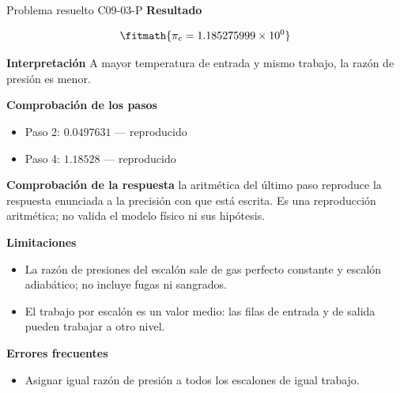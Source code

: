 \documentclass[10pt,openany]{book}
\begin{document}
\begin{studiumworked}{Problema resuelto C09-03-P}
\noindent\textbf{Resultado}

\[
\fitmath{\pi_c=1.185275999\times10^{0}}
\]

\noindent\textbf{Interpretación}
A mayor temperatura de entrada y mismo trabajo, la razón de presión es menor.

\noindent\textbf{Comprobación de los pasos}
\begin{itemize}
\item Paso 2: $0.0497631$ — reproducido
\item Paso 4: $1.18528$ — reproducido
\end{itemize}

\noindent\textbf{Comprobación de la respuesta} la aritmética del último paso reproduce la respuesta enunciada a la precisión con que está escrita. Es una reproducción aritmética; no valida el modelo físico ni sus hipótesis.

\noindent\textbf{Limitaciones}
\begin{itemize}
\item La razón de presiones del escalón sale de gas perfecto constante y escalón adiabático; no incluye fugas ni sangrados.
\item El trabajo por escalón es un valor medio: las filas de entrada y de salida pueden trabajar a otro nivel.
\end{itemize}

\noindent\textbf{Errores frecuentes}
\begin{itemize}
\item Asignar igual razón de presión a todos los escalones de igual trabajo.
\end{itemize}
\end{studiumworked}
\end{document}
